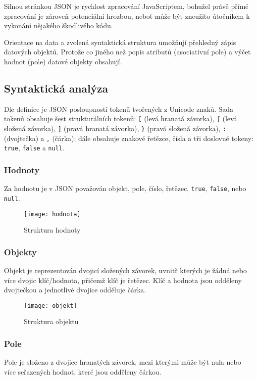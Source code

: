Silnou stránkou JSON je rychlost zpracování JavaScriptem, bohužel právě přímé zpracování je zároveň potenciální hrozbou, neboť může být zneužito útočníkem k vykonání nějakého škodlivého kódu.

Orientace na data a zvolená syntaktická struktura umožňují přehledný zápis datových objektů. Protože co jiného než popis atributů (asociativní pole) a výčet hodnot (pole) datové objekty obsahují.

\subsection{Syntaktická analýza}
\label{syntaxeJson}
Dle definice \cite{json} je JSON posloupností tokenů tvořených z Unicode znaků. Sada tokenů obsahuje šest strukturálních tokenů: \texttt{[} (levá hranatá závorka), \texttt{\{} (levá složená závorka), \texttt{]} (pravá hranatá závorka), \texttt{\}} (pravá složená závorka), \texttt{:} (dvojtečka) a \texttt{,} (čárka); dále obsahuje znakové řetězce, čísla a tři doslovné tokeny: \texttt{true}, \texttt{false} a \texttt{null}.

\subsubsection{Hodnoty}
Za hodnotu je v JSON považován objekt, pole, číslo, řetězec, \texttt{true}, \texttt{false}, nebo \texttt{null}.

\begin{figure}[!htb]
\centering
\texttt{[image: hodnota]}
\caption{Struktura hodnoty}
\label{hodnota}
\end{figure}

\subsubsection{Objekty}
Objekt je reprezentován dvojicí složených závorek, uvnitř kterých je žádná nebo více dvojic klíč/hodnota, přičemž klíč je řetězec. Klíč a hodnota jsou odděleny dvojtečkou a jednotlivé dvojice odděluje čárka.

\begin{figure}[!htb]
\centering
\texttt{[image: objekt]}
\caption{Struktura objektu}
\label{objekt}
\end{figure}

\subsubsection{Pole}
Pole je složeno z dvojice hranatých závorek, mezi kterými může být nula nebo více seřazených hodnot, které jsou odděleny čárkou.

